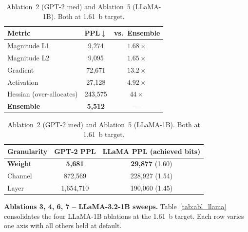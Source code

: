 \documentclass[11pt]{article}
\begin{document}
\begin{table}[h]
\small
\centering
\begin{minipage}[t]{0.46\linewidth}
\centering
\caption{Ablation~1 (GPT-2 medium, 1.61~b).}
\label{tab:abl_metric}
\begin{tabular}{@{}lcc@{}}
\toprule
Metric & PPL$\downarrow$ & vs.\ Ensemble \\
\midrule
Magnitude L1 & 9{,}274  & $1.68\times$ \\
Magnitude L2 & 9{,}095  & $1.65\times$ \\
Gradient     & 72{,}671 & $13.2\times$ \\
Activation   & 27{,}128 & $4.92\times$ \\
Hessian (over-allocates)& 243{,}575 & $44\times$ \\
\midrule
\textbf{Ensemble} & \textbf{5{,}512} & --- \\
\bottomrule
\end{tabular}
\end{minipage}\hfill%
\begin{minipage}[t]{0.50\linewidth}
\centering
\caption{Ablation~2 (GPT-2 med) and Ablation~5 (LLaMA-1B).
Both at 1.61~b target.}
\label{tab:abl_gran}
\begin{tabular}{@{}lcc@{}}
\toprule
Granularity & GPT-2 PPL & LLaMA PPL (achieved bits) \\
\midrule
\textbf{Weight}  & \textbf{5{,}681} & \textbf{29{,}877} (1.60) \\
Channel & 872{,}569 & 228{,}927 (1.54) \\
Layer   & 1{,}654{,}710 & 190{,}060 (1.45) \\
\bottomrule
\end{tabular}
\end{minipage}
\end{table}

\textbf{Ablations 3, 4, 6, 7 -- LLaMA-3.2-1B sweeps.}
Table~\ref{tab:abl_llama} consolidates the four LLaMA-1B ablations at the 1.61~b target.
Each row varies one axis with all others held at default.
\end{document}
